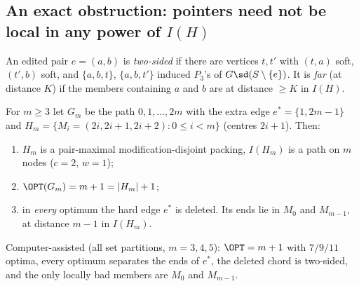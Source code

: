 \subsection{An exact obstruction: pointers need not be local in any power of \texorpdfstring{$I(H)$}{I(H)}}
An edited pair $e=(a,b)$ is \emph{two-sided} if there are vertices $t,t'$ with $(t,a)$ soft, $(t',b)$ soft, and $\{a,b,t\}$, $\{a,b,t'\}$ induced $P_3$'s of $G\sd(S\setminus\{e\})$. It is \emph{far} (at distance $K$) if the members containing $a$ and $b$ are at distance $\ge K$ in $I(H)$.
\begin{proposition}[FAR]\label{prop:FAR}
For $m\ge3$ let $G_m$ be the path $0,1,\dots,2m$ with the extra edge $e^*=\{1,2m-1\}$ and $H_m=\{M_i=(2i,2i+1,2i+2):0\le i<m\}$ (centres $2i+1$). Then:
\begin{enumerate}
\item[(i)] $H_m$ is a pair-maximal modification-disjoint packing, $I(H_m)$ is a path on $m$ nodes ($c=2$, $w=1$);
\item[(ii)] $\OPT(G_m)=m+1=|H_m|+1$;
\item[(iii)] in \emph{every} optimum the hard edge $e^*$ is deleted. Its ends lie in $M_0$ and $M_{m-1}$, at distance $m-1$ in $I(H_m)$.
\end{enumerate}
Computer-assisted (all set partitions, $m=3,4,5$): $\OPT=m+1$ with $7/9/11$ optima, every optimum separates the ends of $e^*$, the deleted chord is two-sided, and the only locally bad members are $M_0$ and $M_{m-1}$.
\end{proposition}
